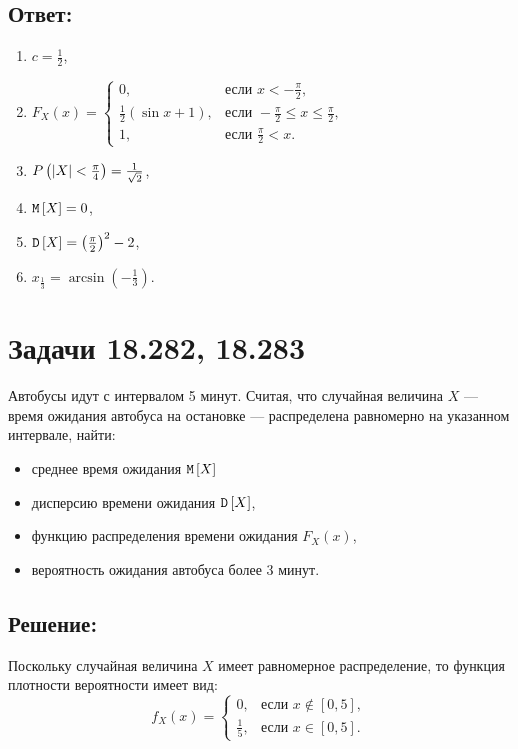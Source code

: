 \subsection*{Ответ:}
\begin{enumerate}
    \item $c = \frac{1}{2}$,
    \item $F_X(x)
    = \left \{
    \begin{array}{ll}
        0,                                       & \text{если } x < - \frac{\pi}{2},                    \\
        \frac{1}{2} \left ( \sin x + 1 \right ), & \text{если } -\frac{\pi}{2} \le x \le \frac{\pi}{2}, \\
        1,                                       & \text{если } \frac{\pi}{2} < x .
    \end{array}
    \right .
    $
    \item $P \left ( \left | X \right | < \frac{\pi}{4} \right ) = \frac{1}{\sqrt{2}}$,
    \item $\mathtt{M} \left [ X \right ] = 0$,
    \item $\mathtt{D} \left [ X \right ] = \left ( \frac{\pi}{2} \right )^2 - 2$,
    \item $x_{\frac{1}{3}} = \arcsin \left (- \frac{1}{3} \right )$.
\end{enumerate}

\section*{Задачи 18.282, 18.283}

Автобусы идут с интервалом 5 минут. Считая, что случайная величина $X$ --- время ожидания автобуса на остановке --- распределена равномерно на указанном интервале,
найти:
\begin{itemize}
    \item среднее время ожидания $\mathtt{M} \left [ X \right ]$
    \item дисперсию времени ожидания $\mathtt{D} \left [ X \right ]$,
    \item функцию распределения времени ожидания $F_X(x)$,
    \item вероятность ожидания автобуса более 3 минут.
\end{itemize}

\subsection*{Решение:}

Поскольку случайная величина $X$ имеет равномерное распределение, то функция плотности вероятности имеет вид:
\begin{equation}
    f_X(x)
    = \left \{
    \begin{array}{ll}
        0,           & \text{если } x \notin \left [ 0, 5 \right ], \\
        \frac{1}{5}, & \text{если } x \in \left [ 0, 5 \right ] .
    \end{array}
    \right .
\end{equation}


